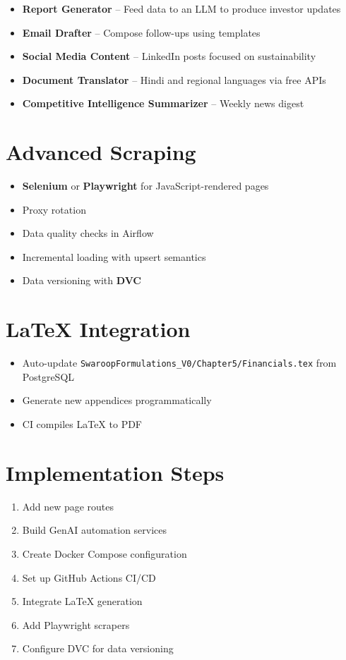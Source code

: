 \documentclass{article}
\begin{document}
\begin{itemize}[leftmargin=*]
  \item \textbf{Report Generator} -- Feed data to an LLM to produce investor updates
  \item \textbf{Email Drafter} -- Compose follow-ups using templates
  \item \textbf{Social Media Content} -- LinkedIn posts focused on sustainability
  \item \textbf{Document Translator} -- Hindi and regional languages via free APIs
  \item \textbf{Competitive Intelligence Summarizer} -- Weekly news digest
\end{itemize}

\section{Advanced Scraping}

\begin{itemize}[leftmargin=*]
  \item \textbf{Selenium} or \textbf{Playwright} for JavaScript-rendered pages
  \item Proxy rotation
  \item Data quality checks in Airflow
  \item Incremental loading with upsert semantics
  \item Data versioning with \textbf{DVC}
\end{itemize}

\section{LaTeX Integration}

\begin{itemize}[leftmargin=*]
  \item Auto-update \texttt{SwaroopFormulations\_V0/Chapter5/Financials.tex} from PostgreSQL
  \item Generate new appendices programmatically
  \item CI compiles LaTeX to PDF
\end{itemize}

\section{Implementation Steps}

\begin{enumerate}[leftmargin=*]
  \item Add new page routes
  \item Build GenAI automation services
  \item Create Docker Compose configuration
  \item Set up GitHub Actions CI/CD
  \item Integrate LaTeX generation
  \item Add Playwright scrapers
  \item Configure DVC for data versioning
\end{enumerate}
\end{document}
